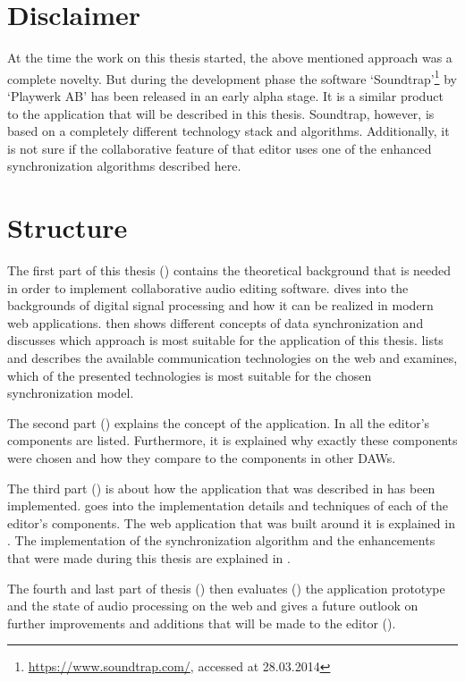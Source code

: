 \section{Disclaimer}

At the time the work on this thesis started, the above mentioned approach was a complete novelty. But during the development phase the software `Soundtrap'\footnote{\url{https://www.soundtrap.com/}, accessed at 28.03.2014} by `Playwerk AB' has been released in an early alpha stage. It is a similar product to the application that will be described in this thesis. Soundtrap, however, is based on a completely different technology stack and algorithms. Additionally, it is not sure if the collaborative feature of that editor uses one of the enhanced synchronization algorithms described here.

\section{Structure}

The first part of this thesis () contains the theoretical background that is needed in order to implement collaborative audio editing software.  dives into the backgrounds of digital signal processing and how it can be realized in modern web applications.  then shows different concepts of data synchronization and discusses which approach is most suitable for the application of this thesis.  lists and describes the available communication technologies on the web and examines, which of the presented technologies is most suitable for the chosen synchronization model.

The second part () explains the concept of the application. In  all the editor's components are listed. Furthermore, it is explained why exactly these components were chosen and how they compare to the components in other DAWs.

The third part () is about how the application that was described in  has been implemented.  goes into the implementation details and techniques of each of the editor's components. The web application that was built around it is explained in . The implementation of the synchronization algorithm and the enhancements that were made during this thesis are explained in .

The fourth and last part of thesis () then evaluates () the application prototype and the state of audio processing on the web and gives a future outlook on further improvements and additions that will be made to the editor ().